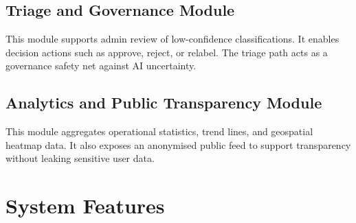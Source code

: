 \subsection{Triage and Governance Module}

This module supports admin review of low-confidence classifications. It enables decision actions such as approve, reject, or relabel. The triage path acts as a governance safety net against AI uncertainty.

\subsection{Analytics and Public Transparency Module}

This module aggregates operational statistics, trend lines, and geospatial heatmap data. It also exposes an anonymised public feed to support transparency without leaking sensitive user data.

\section{System Features}

